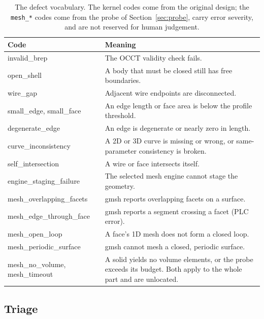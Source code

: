 \documentclass[10pt,onecolumn]{article}
\newcommand{\code}[1]{\texttt{\small #1}}
\newcommand{\tablecode}{\renewcommand{\code}[1]{{\fontsize{7.2}{8.6}\selectfont\ttfamily ##1}}}
\begin{document}
\begin{table}[h]
\centering
\caption{The defect vocabulary. The kernel codes come from the original design; the \code{mesh\_*}
codes come from the probe of Section~\ref{sec:probe}, carry error severity, and are not reserved for
human judgement.}
\label{tab:codes}
\footnotesize\tablecode
\begin{tabularx}{\textwidth}{@{}L{40mm}X@{}}
\toprule
\textbf{Code} & \textbf{Meaning}\\
\midrule
\code{invalid\_brep}            & The OCCT validity check fails.\\
\code{open\_shell}              & A body that must be closed still has free boundaries.\\
\code{wire\_gap}                & Adjacent wire endpoints are disconnected.\\
\code{small\_edge}, \code{small\_face} & An edge length or face area is below the profile threshold.\\
\code{degenerate\_edge}         & An edge is degenerate or nearly zero in length.\\
\code{curve\_inconsistency}     & A 2D or 3D curve is missing or wrong, or same-parameter consistency is broken.\\
\code{self\_intersection}       & A wire or face intersects itself.\\
\code{engine\_staging\_failure} & The selected mesh engine cannot stage the geometry.\\
\code{mesh\_overlapping\_facets}& gmsh reports overlapping facets on a surface.\\
\code{mesh\_edge\_through\_face}& gmsh reports a segment crossing a facet (PLC error).\\
\code{mesh\_open\_loop}         & A face's 1D mesh does not form a closed loop.\\
\code{mesh\_periodic\_surface}  & gmsh cannot mesh a closed, periodic surface.\\
\code{mesh\_no\_volume}, \code{mesh\_timeout} & A solid yields no volume elements, or the probe
exceeds its budget. Both apply to the whole part and are unlocated.\\
\bottomrule
\end{tabularx}
\end{table}

\subsection{Triage}
\end{document}
